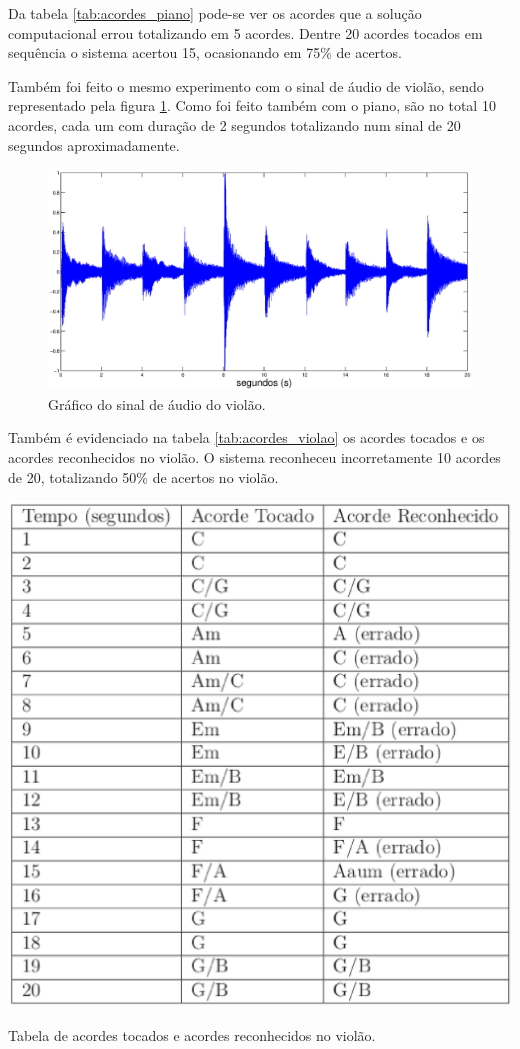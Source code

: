 Da tabela \ref{tab:acordes_piano} pode-se ver os acordes que a solução computacional errou totalizando em 5 acordes. Dentre 20 acordes tocados em sequência o sistema acertou 15, ocasionando em 75\% de acertos.

Também foi feito o mesmo experimento com o sinal de áudio de violão, sendo representado pela figura \ref{fig:acordes_violao}. Como foi feito também com o piano, são no total 10 acordes, cada um com duração de 2 segundos totalizando num sinal de 20 segundos aproximadamente.

\begin{figure}[h]
    \centering
    \includegraphics[keepaspectratio=true,scale=0.3]{figuras/acordes_violao.eps}
  \caption{Gráfico do sinal de áudio do violão.}
  \label{fig:acordes_violao}
\end{figure}

Também é evidenciado na tabela \ref{tab:acordes_violao} os acordes tocados e os acordes reconhecidos no violão. O sistema reconheceu incorretamente 10 acordes de 20, totalizando 50\% de acertos no violão.

\begin{table}[h]
\centering
    \includegraphics[keepaspectratio=true,scale=0.5]{figuras/tabela_acordes_violao.eps}
  \caption{Tabela de acordes tocados e acordes reconhecidos no violão.}
  \label{tab:acordes_violao}
\end{table}

